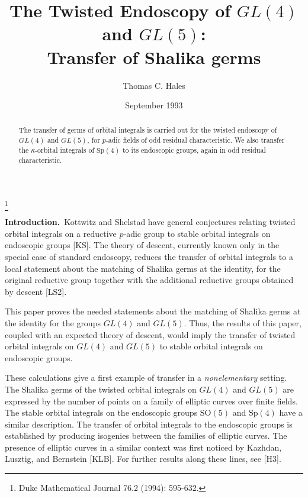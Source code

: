 \documentclass{amsart}
\begin{document}
\title[Twisted Endoscopy]{The Twisted Endoscopy of $GL(4)$ and $GL(5)$:\\
 Transfer of Shalika germs}
\author{Thomas C. Hales}
\address{University of Chicago}
\date{September 1993}
\thanks{Duke Mathematical Journal 76.2 (1994): 595-632.}



\begin{abstract}  The transfer of germs of orbital integrals 
is carried out for the twisted endoscopy of $GL(4)$ and
$GL(5)$, for $p$-adic fields of odd  residual characteristic.
We also transfer the $\kappa$-orbital integrals of $\text{Sp}(4)$
to its endoscopic groups, again in odd residual characteristic.
\end{abstract}
\maketitle

\bigskip

\noindent
{\bf Introduction.}\   Kottwitz and Shelstad have general
conjectures relating twisted orbital integrals on a reductive
$p$-adic group to stable orbital integrals on endoscopic groups [KS].
The theory of descent, currently known only in the special
case of standard endoscopy, reduces the transfer of orbital
integrals to a local statement about the matching of Shalika
germs at the identity, for the original reductive group
together with the additional reductive groups obtained 
by descent [LS2].

This paper proves the needed statements about the matching
of Shalika germs at the identity for the groups $GL(4)$ and
$GL(5)$.  Thus, the results of this paper, coupled with
an expected theory of descent, would imply the transfer of
twisted orbital integrals on $GL(4)$ and $GL(5)$ to stable
orbital integrals on endoscopic groups.

These calculations give a first example of transfer in 
a {\it nonelementary} setting.  The Shalika germs of the
twisted orbital integrals on $GL(4)$ and $GL(5)$ 
are expressed
by the number of points on a family of elliptic curves over
finite fields.  The stable orbital integrals on the endoscopic
groups $\text{SO}(5)$ and $\text{Sp}(4)$ have a similar description.
The transfer of orbital integrals to the
endoscopic groups is established by producing isogenies
between the families of elliptic curves.  
The presence of elliptic curves in a similar context
was first noticed by
Kazhdan, Lusztig, and Bernstein [KLB].  For further 
results along these lines, see [H3].
\end{document}
